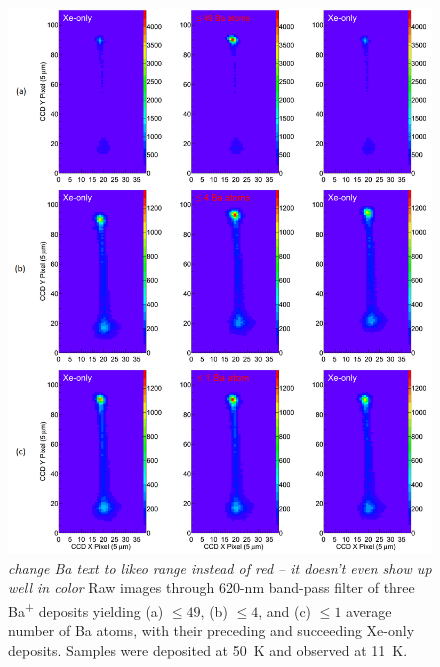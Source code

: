 


\begin{figure} %
        \centering
                \includegraphics[width=.95\textwidth]{figures/xebaxe_average_scrunched.png}
                \caption{\emph{\color{gray}change Ba text to likeo range instead of red -- it doesn't even show up well in color} Raw images through 620-nm band-pass filter of three Ba\textsuperscript{+} deposits yielding (a) $\leq 49$, (b) $\leq 4$, and (c) $\leq 1$ average number of Ba atoms, with their preceding and succeeding Xe-only deposits.  Samples were deposited at 50~K and observed at 11~K.}
\label{fig:xebaxe}
\end{figure}

